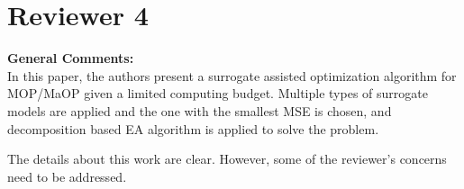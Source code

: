 \documentclass[onecolumn,10pt]{asme2ej}
\begin{document}
\section*{Reviewer 4}

\vspace{1em}
\textbf{General Comments:}\\

In this paper, the authors present a surrogate assisted optimization algorithm for MOP/MaOP given a limited computing budget. Multiple types of surrogate models are applied and the one with the smallest MSE is chosen, and decomposition based EA algorithm is applied to solve the problem.

The details about this work are clear. However, some of the reviewer's concerns need to be addressed.\\
\end{document}
